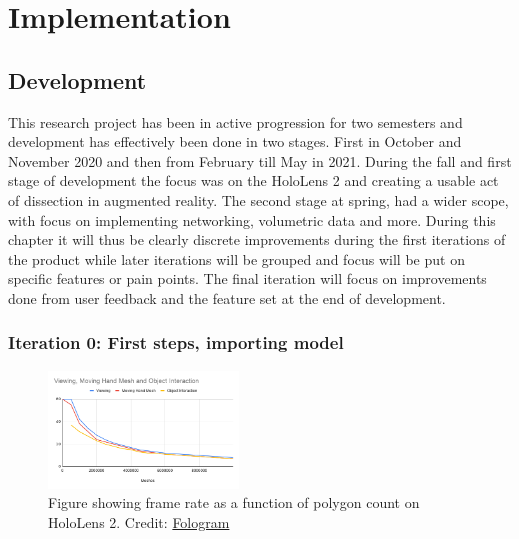 


\chapter{Implementation}




\section{Development}
This research project has been in active progression for two semesters and development has effectively been done in two stages. First in October and November 2020 and then from February till May in 2021. During the fall and first stage of development the focus was on the HoloLens 2 and creating a usable act of dissection in augmented reality. The second stage at spring, had a wider scope, with focus on implementing networking, volumetric data and more. During this chapter it will thus be clearly discrete improvements during the first iterations of the product while later iterations will be grouped and focus will be put on specific features or pain points. The final iteration will focus on improvements done from user feedback and the feature set at the end of development.

\subsection[Iteration 0]{Iteration 0: First steps, importing model}\label{chap:zeroiter}

\begin{figure} 
    \centering
    \includegraphics[width=0.45\textwidth]{fig/hololens2polycount}
    \caption{Figure showing frame rate as a function of polygon count on HoloLens 2. Credit: \href{https://community.fologram.com/t/hololens-2-polygon-count-and-frame-rate/49}{Fologram}}
    \vspace{20pt}
    \label{fig:polycount}
\end{figure}

